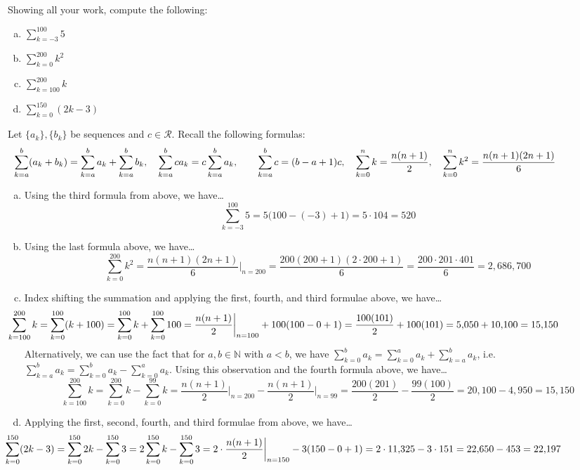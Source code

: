 \documentclass[11pt,letterpaper]{article}
\begin{document}
\newpage



 Showing all your work, compute the following:
	\begin{enumerate}[(a)]
	\item $\displaystyle \sum_{k= -3}^{100} 5$
	\item $\displaystyle \sum_{k=0}^{200} k^2$
	\item $\displaystyle \sum_{k=100}^{200} k$
	\item $\displaystyle \sum_{k=0}^{150} (2k - 3)$
	\end{enumerate} \pspace

\sol Let $\{ a_k \}, \{ b_k \}$ be sequences and $c \in \mathcal{R}$. Recall the following formulas: 
	\[
	\hspace{-1.75cm} \sum_{k= a}^b (a_k + b_k)= \sum_{k= a}^b a_k + \sum_{k=a}^b b_k, \quad \sum_{k= a}^b ca_k= c \sum_{k= a}^b a_k, \qquad \sum_{k= a}^b c= (b - a + 1)c, \quad \sum_{k=0}^n k= \dfrac{n(n + 1)}{2}, \quad \sum_{k=0}^n k^2= \dfrac{n(n + 1)(2n + 1)}{6}
	\] 

\begin{enumerate}[(a)]
\item Using the third formula from above, we have\dots
	\[
	\sum_{k= -3}^{100} 5= 5 \big( 100 - (-3) + 1 \big)= 5 \cdot 104= 520
	\] 

\item Using the last formula above, we have\dots
	\[
	\sum_{k=0}^{200} k^2= \dfrac{n (n + 1)(2n + 1)}{6} \bigg|_{n= 200}= \dfrac{200 (200 + 1)(2 \cdot 200 + 1)}{6}= \dfrac{200 \cdot 201 \cdot 401}{6}= 2,\!686,\!700
	\] 

\item Index shifting the summation and applying the first, fourth, and third formulae above, we have\dots
	\[
	\hspace{-2.5cm} \sum_{k=100}^{200} k= \sum_{k=0}^{100} (k + 100)= \sum_{k=0}^{100} k  + \sum_{k=0}^{100} 100= \dfrac{n(n + 1)}{2} \bigg|_{n= 100} + 100(100 - 0 + 1)= \dfrac{100(101)}{2} + 100(101)= 5,\!050 + 10,\!100= 15,\!150
	\] 
Alternatively, we can use the fact that for $a, b \in \mathbb{N}$ with $a < b$, we have $\sum_{k= 0}^b a_k= \sum_{k= 0}^a a_k + \sum_{k= a}^b a_k$, i.e. $\sum_{k= a}^b a_k= \sum_{k= 0}^b a_k - \sum_{k= 0}^a a_k$. Using this observation and the fourth formula above, we have\dots
	\[
	\sum_{k=100}^{200} k= \sum_{k=0}^{200} k - \sum_{k=0}^{99} k= \dfrac{n(n + 1)}{2} \bigg|_{n= 200} - \dfrac{n(n + 1)}{2} \bigg|_{n= 99}= \dfrac{200(201)}{2} - \dfrac{99(100)}{2}= 20,\!100 - 4,\!950= 15,\!150
	\]

\item Applying the first, second, fourth, and third formulae from above, we have\dots
	\[
	\hspace{-2.5cm} \sum_{k=0}^{150} (2k - 3)= \sum_{k=0}^{150} 2k - \sum_{k=0}^{150} 3= 2 \sum_{k=0}^{150} k - \sum_{k=0}^{150} 3= 2 \cdot \dfrac{n(n + 1)}{2} \bigg|_{n=150} - 3 (150 - 0 + 1)= 2 \cdot 11,\!325 - 3 \cdot 151= 22,\!650 - 453= 22,\!197
	\]
\end{enumerate}
\end{document}
